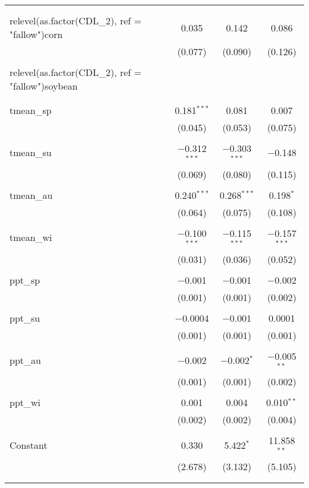\begin{table}[!htbp]
\begin{tabular}{@{\extracolsep{5pt}}lccc}
  &  &  &  \\ 
  & & & \\ 
 relevel(as.factor(CDL\_2), ref = "fallow")corn & 0.035 & 0.142 & 0.086 \\ 
  & (0.077) & (0.090) & (0.126) \\ 
  & & & \\ 
 relevel(as.factor(CDL\_2), ref = "fallow")soybean &  &  &  \\ 
  &  &  &  \\ 
  & & & \\ 
 tmean\_sp & 0.181$^{***}$ & 0.081 & 0.007 \\ 
  & (0.045) & (0.053) & (0.075) \\ 
  & & & \\ 
 tmean\_su & $-$0.312$^{***}$ & $-$0.303$^{***}$ & $-$0.148 \\ 
  & (0.069) & (0.080) & (0.115) \\ 
  & & & \\ 
 tmean\_au & 0.240$^{***}$ & 0.268$^{***}$ & 0.198$^{*}$ \\ 
  & (0.064) & (0.075) & (0.108) \\ 
  & & & \\ 
 tmean\_wi & $-$0.100$^{***}$ & $-$0.115$^{***}$ & $-$0.157$^{***}$ \\ 
  & (0.031) & (0.036) & (0.052) \\ 
  & & & \\ 
 ppt\_sp & $-$0.001 & $-$0.001 & $-$0.002 \\ 
  & (0.001) & (0.001) & (0.002) \\ 
  & & & \\ 
 ppt\_su & $-$0.0004 & $-$0.001 & 0.0001 \\ 
  & (0.001) & (0.001) & (0.001) \\ 
  & & & \\ 
 ppt\_au & $-$0.002 & $-$0.002$^{*}$ & $-$0.005$^{**}$ \\ 
  & (0.001) & (0.001) & (0.002) \\ 
  & & & \\ 
 ppt\_wi & 0.001 & 0.004 & 0.010$^{**}$ \\ 
  & (0.002) & (0.002) & (0.004) \\ 
  & & & \\ 
 Constant & 0.330 & 5.422$^{*}$ & 11.858$^{**}$ \\ 
  & (2.678) & (3.132) & (5.105) \\ 
  & & & \\ 
\hline \\[-1.8ex] 

\end{tabular}
\end{table}
